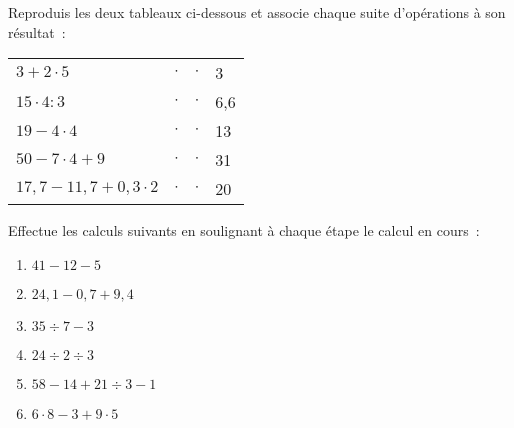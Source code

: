 

\begin{exercice}
Reproduis les deux tableaux ci-dessous et associe chaque suite d'opérations à son résultat :
\begin{center}
 \begin{tabularx}{\linewidth}{|X|lr|l|} %
  \cline{1-1}\cline{4-4}
  $3 + 2 \cdot 5$ & $\cdot$ & $\cdot$ & 3 \\  \cline{1-1}\cline{4-4}
  $15 \cdot 4 : 3$ & $\cdot$ & $\cdot$ & 6,6 \\ \cline{1-1}\cline{4-4}
  $19 - 4 \cdot 4$ & $\cdot$ & $\cdot$ & 13 \\ \cline{1-1}\cline{4-4}
  $50 - 7 \cdot 4 + 9$ & $\cdot$ & $\cdot$ & 31 \\ \cline{1-1}\cline{4-4}
  $17,7 - 11,7 + 0,3 \cdot 2$ & $\cdot$ & $\cdot$ & 20 \\ \cline{1-1}\cline{4-4}
  \end{tabularx}
\end{center}

\end{exercice}


\begin{exercice}
Effectue les calculs suivants en soulignant à chaque étape le calcul en cours :
\begin{enumerate}
 \item $41 - 12 - 5$ \dotfill
 
 \dotfill
 
 \item  $24,1 - 0,7 + 9,4$ \dotfill
 
 \dotfill
 
 \item $35 \div 7 - 3$ \dotfill
 
 \dotfill
 
 \item $24 \div 2 \div 3$ \dotfill
 
 \dotfill
 
 \item $58 - 14 + 21 \div 3 - 1$ \dotfill
 
 \dotfill
 
 \item $6 \cdot 8 - 3 + 9 \cdot 5$ \dotfill
 
 \dotfill
 \end{enumerate}
\end{exercice}


